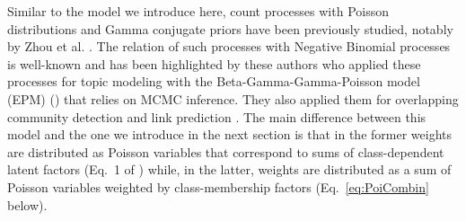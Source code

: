 Similar to the model we introduce here, count processes with Poisson distributions and Gamma conjugate priors have been previously studied, notably by Zhou et al. \cite{zhou2012augment, zhou2015negative}. The relation of such processes with Negative Binomial processes is well-known and has been highlighted by these authors who applied  these processes for topic modeling with the Beta-Gamma-Gamma-Poisson model (EPM) (\cite{zhou2012beta}) that relies on MCMC inference. They also applied them for overlapping community detection and link prediction \cite{zhou2015}. The main difference between this model and the one we introduce in the next section is that in the former weights are distributed as Poisson variables that correspond to sums of class-dependent latent factors (Eq.~1 of \cite{zhou2012beta}) while, in the latter, weights are distributed as a sum of Poisson variables weighted by class-membership factors (Eq.~\ref{eq:PoiCombin} below).


%
%
%
%
%
%
%

